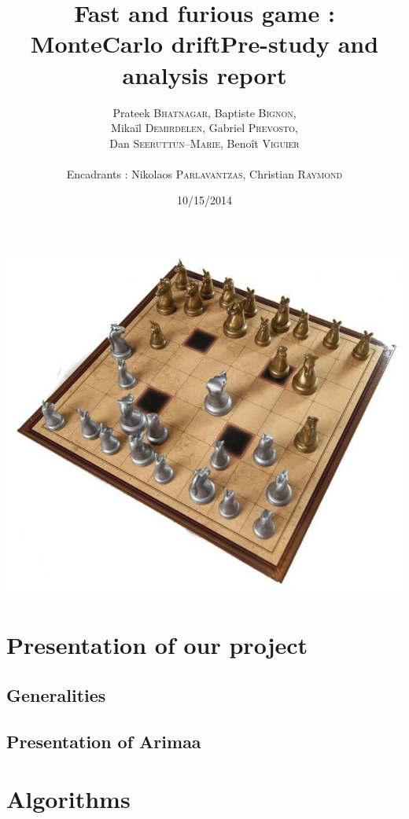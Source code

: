 \documentclass[12pt]{article}
\title{Fast and furious game : MonteCarlo drift\smallbreak Pre-study and analysis report}
\author{Prateek \textsc{Bhatnagar}, Baptiste \textsc{Bignon}, \\
        Mikaïl \textsc{Demirdelen}, Gabriel \textsc{Prevosto}, \\
        Dan \textsc{Seeruttun--Marie}, Benoît \textsc{Viguier} \\
        \\
        Encadrants : Nikolaos \textsc{Parlavantzas}, Christian \textsc{Raymond}}
\date{10/15/2014}
\begin{document}
\maketitle
\includegraphics[scale=0.5]{img/arimaa}
\newpage
\begin{abstract}

\end{abstract}


\newpage
\tableofcontents
\newpage

\section{Presentation of our project}
\subsection{Generalities}
\subsection{Presentation of Arimaa} 
\section{Algorithms}
\end{document}
